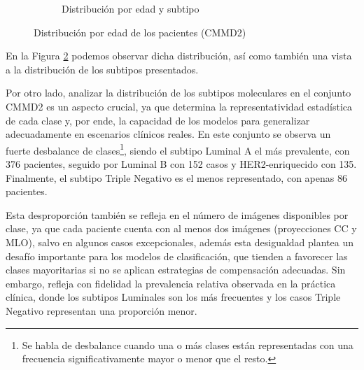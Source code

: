 \documentclass[a4paper,10pt]{book}
\begin{document}
\begin{figure}[h!]
\begin{subfigure}[c]{0.49\textwidth}
        \caption{Distribución por edad y subtipo}
        \label{fig:age_subtype}
    \end{subfigure}
    \caption{Distribución por edad de los pacientes (CMMD2)}
    \label{fig:age_dist_all}
\end{figure}

En la Figura \ref{fig:age_dist_all} podemos observar dicha distribución, así como también una vista a la distribución de los subtipos presentados.

Por otro lado, analizar la distribución de los subtipos moleculares en el conjunto CMMD2 es un aspecto crucial, ya que determina la representatividad estadística de cada clase y, por ende, la capacidad de los modelos para generalizar adecuadamente en escenarios clínicos reales. En este conjunto se observa un fuerte desbalance de clases\footnote{Se habla de desbalance cuando una o más clases están representadas con una frecuencia significativamente mayor o menor que el resto.}, siendo el subtipo Luminal A el más prevalente, con 376 pacientes, seguido por Luminal B con 152 casos y HER2-enriquecido con 135. Finalmente, el subtipo Triple Negativo es el menos representado, con apenas 86 pacientes.

Esta desproporción también se refleja en el número de imágenes disponibles por clase, ya que cada paciente cuenta con al menos dos imágenes (proyecciones CC y MLO), salvo en algunos casos excepcionales, además esta desigualdad plantea un desafío importante para los modelos de clasificación, que tienden a favorecer las clases mayoritarias si no se aplican estrategias de compensación adecuadas. Sin embargo, refleja con fidelidad la prevalencia relativa observada en la práctica clínica, donde los subtipos Luminales son los más frecuentes y los casos Triple Negativo representan una proporción menor.
\end{document}
